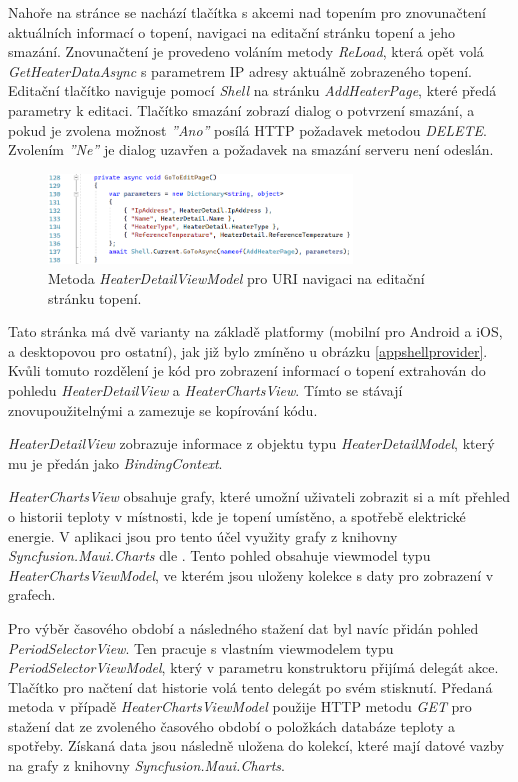 Nahoře na stránce se nachází tlačítka s akcemi nad topením pro znovunačtení aktuálních informací o topení, navigaci na editační stránku topení a jeho smazání. Znovunačtení je provedeno voláním metody {\it ReLoad}, která opět volá {\it GetHeaterDataAsync} s parametrem IP adresy aktuálně zobrazeného topení. Editační tlačítko naviguje pomocí {\it Shell} na stránku {\it AddHeaterPage}, které předá parametry k editaci. Tlačítko smazání zobrazí dialog o potvrzení smazání, a pokud je zvolena možnost {\it ''Ano''} posílá HTTP požadavek metodou {\it DELETE}. Zvolením {\it ''Ne''} je dialog uzavřen a požadavek na smazání serveru není odeslán.

\begin{figure}[hbt]
\includegraphics[width=0.72\textwidth]{obrazky-figures/code-gotoedit.png}
\caption{Metoda {\it HeaterDetailViewModel} pro URI navigaci na editační stránku topení.}
\end{figure}

Tato stránka má dvě varianty na základě platformy (mobilní pro Android a iOS, a desktopovou pro ostatní), jak již bylo zmíněno u obrázku \ref{appshellprovider}. Kvůli tomuto rozdělení je kód pro zobrazení informací o topení extrahován do pohledu {\it HeaterDetailView} a {\it HeaterChartsView}. Tímto se stávají znovupoužitelnými a zamezuje se kopírování kódu.

{\it HeaterDetailView} zobrazuje informace z objektu typu {\it HeaterDetailModel}, který mu je předán jako {\it BindingContext}.

{\it HeaterChartsView} obsahuje grafy, které umožní uživateli zobrazit si a mít přehled o historii teploty v místnosti, kde je topení umístěno, a spotřebě elektrické energie. V aplikaci jsou pro tento účel využity grafy z knihovny {\it Syncfusion.Maui.Charts} dle \cite{maui-charts}. Tento pohled obsahuje viewmodel typu {\it HeaterChartsViewModel}, ve kterém jsou uloženy kolekce s daty pro zobrazení v grafech.

Pro výběr časového období a následného stažení dat byl navíc přidán pohled {\it PeriodSelectorView}. Ten pracuje s vlastním viewmodelem typu {\it PeriodSelectorViewModel}, který v parametru konstruktoru přijímá delegát akce. Tlačítko pro načtení dat historie volá tento delegát po svém stisknutí. Předaná metoda v případě {\it HeaterChartsViewModel} použije HTTP metodu {\it GET} pro stažení dat ze zvoleného časového období o položkách databáze teploty a spotřeby. Získaná data jsou následně uložena do kolekcí, které mají datové vazby na grafy z knihovny {\it Syncfusion.Maui.Charts}.

